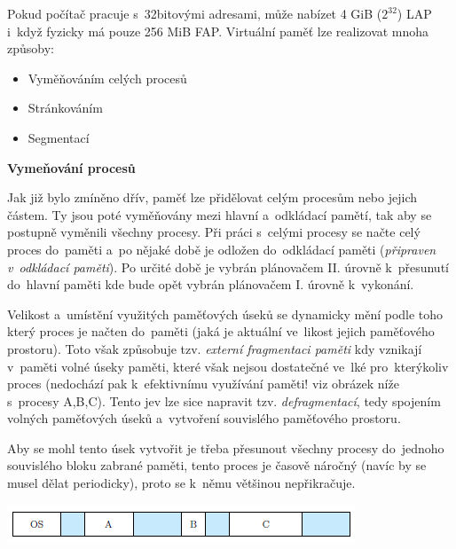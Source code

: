 Pokud počítač pracuje s~32bitovými adresami, může nabízet 4 GiB ($2^{32}$) LAP i~když fyzicky má pouze 256 MiB FAP. Virtuální paměť lze realizovat mnoha způsoby:
\begin{itemize}
    \item Vyměňováním celých procesů
    \item Stránkováním
    \item Segmentací
\end{itemize}

\begin{Large}
    \vspace{0,5cm}
    \textbf{Vymeňování procesů}
\end{Large}

Jak již bylo zmíněno dřív, paměť lze přidělovat celým procesům nebo jejich částem. Ty jsou poté vyměňovány mezi hlavní a~odkládací pamětí, tak aby se postupně vyměnili všechny procesy. Při práci s~celými procesy se načte celý proces do~paměti a~po nějaké době je odložen do~odkládací paměti (\emph{připraven v~odkládací paměti}). Po určité době je vybrán plánovačem II. úrovně k~přesunutí do~hlavní paměti kde bude opět vybrán plánovačem I. úrovně k~vykonání. 

\vspace{0,5cm}

Velikost a~umístění využitých paměťových úseků se dynamicky mění podle toho který proces je načten do~paměti (jaká je aktuální ve~likost jejich paměťového prostoru). Toto však způsobuje tzv. \emph{externí fragmentaci paměti} kdy vznikají v~paměti volné úseky paměti, které však nejsou dostatečné ve~lké pro~kterýkoliv proces (nedochází pak k~efektivnímu využívání paměti! viz obrázek níže s~procesy A,B,C). Tento jev lze sice napravit tzv. \emph{defragmentací}, tedy spojením volných paměťových úseků a~vytvoření souvislého paměťového prostoru.

\clearpage

Aby se mohl tento úsek vytvořit je třeba přesunout všechny procesy do~jednoho souvislého bloku zabrané paměti, tento proces je časově náročný (navíc by se musel dělat periodicky), proto se k~němu většinou nepřikračuje. 

\begin{center}
    \includegraphics[scale=1]{images/mem_fragmentace.png}
\end{center}

